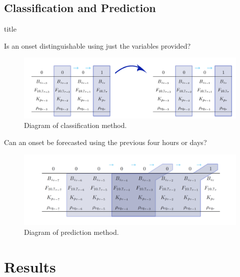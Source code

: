 \documentclass[xcolor={dvipsnames,table}]{beamer}
\newcommand{\subheader}{    		\begin{center}
  	\begin{beamercolorbox}[sep=4pt,center,shadow=true,rounded=true]{title}
  		\usebeamerfont{title}\subsecname\par%
  	\end{beamercolorbox}
  	\vfill
  	\end{center}}
\begin{document}
\subsection{Classification and Prediction}

\begin{frame}
	\subheader
	Is an onset distinguishable using just the variables provided?
	\begin{figure}[htp!]
		\centering
		\includegraphics[width=1\linewidth]{Figures/CH5/ClassifyGraphic2.png}
		\caption{Diagram of classification method.}
		\label{fig:ClassifyDiagram}
	\end{figure}
\end{frame}


\begin{frame}
	Can an onset be forecasted using the previous four hours or days?
	\begin{figure}[htp!]
		\centering
		\includegraphics[width=1\linewidth]{Figures/CH5/FullGraphic.png}
		\caption{Diagram of prediction method.}
		\label{fig:ClassifyDiagram}
	\end{figure}
	
	
\end{frame}

\section{Results}
\end{document}
